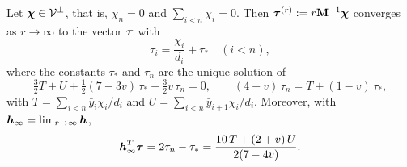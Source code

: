 \begin{lemma}\label{lem:inverse}
Let \(\boldsymbol\chi\in\mathcal V^{\perp}\), that is, \(\chi_n=0\) and \(\sum_{i<n}\chi_i=0\). Then
\(\boldsymbol\tau^{(r)}:=r\mathbf M^{-1}\boldsymbol\chi\) converges as \(r\to\infty\) to the vector \(\boldsymbol\tau\) with
\begin{equation}\label{eq:tau}
 \tau_i=\frac{\chi_i}{d_i}+\tau_\ast\quad(i<n),
\end{equation}
where the constants \(\tau_\ast\) and \(\tau_n\) are the unique solution of
\begin{equation}\label{eq:alpha_beta}
 \tfrac32T+U+\tfrac12(7-3v)\,\tau_\ast+\tfrac32v\,\tau_n=0,\qquad
 (4-v)\,\tau_n=T+(1-v)\,\tau_\ast,
\end{equation}
with \(T=\sum_{i<n}\bar y_i\chi_i/d_i\) and \(U=\sum_{i<n}\bar y_{i+1}\chi_i/d_i\). Moreover, with
\(\boldsymbol h_\infty=\lim_{r\to\infty}\boldsymbol h\),
\begin{equation}\label{eq:feedbacklimit}
 \boldsymbol h_\infty^{T}\boldsymbol\tau=2\tau_n-\tau_\ast=\frac{10\,T+(2+v)\,U}{2(7-4v)} .
\end{equation}
\end{lemma}
